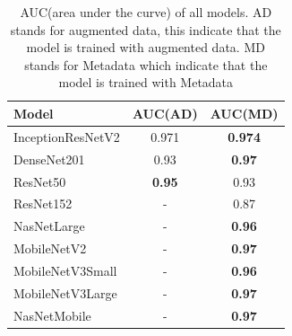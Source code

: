 \documentclass[sensors,article,submit,pdftex,moreauthors]{Definitions/mdpi}
\begin{document}
\begin{table}[H]
	\centering
	\begin{tabular}{| l | c  c | }
		\hline
		Model & AUC(AD) & AUC(MD)\\ 
		\hline
		InceptionResNetV2 & 0.971 & \textbf{0.974}\\
		\hline
		DenseNet201 & 0.93 & \textbf{0.97}\\
		\hline
		ResNet50 & \textbf{0.95} & 0.93 \\
		\hline
		ResNet152 & - & 0.87\\
		\hline
		NasNetLarge & - & \textbf{0.96}\\
		\hline
		MobileNetV2 & - & \textbf{0.97}\\
		\hline
		MobileNetV3Small & - & \textbf{0.96}\\
		\hline
		MobileNetV3Large & - & \textbf{0.97}\\
		\hline
		NasNetMobile & - & \textbf{0.97}\\
		\hline
	\end{tabular}
	\caption{AUC(area under the curve) of all models. AD stands for augmented data, this indicate that the model is trained with augmented data. MD stands for Metadata which indicate that the model is trained with Metadata}
	\label{table:overall-auc}
\end{table}
\end{document}
